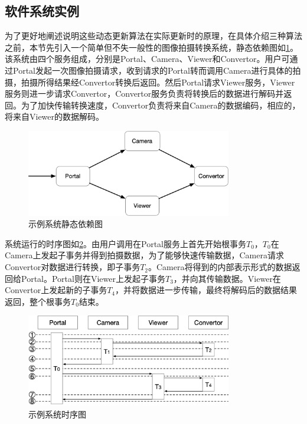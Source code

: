 \documentclass[macfonts,master]{njuthesis}
\begin{document}
\subsection{软件系统实例}\label{sec:example}
为了更好地阐述说明这些动态更新算法在实际更新时的原理，在具体介绍三种算法之前，本节先引入一个简单但不失一般性的图像拍摄转换系统，静态依赖图如\ref{fig:example}。该系统由四个服务组成，分别是Portal、Camera、Viewer和Convertor。用户可通过Portal发起一次图像拍摄请求，收到请求的Portal转而调用Camera进行具体的拍摄，拍摄所得结果经Convertor转换后返回。然后Portal请求Viewer服务，Viewer服务则进一步请求Convertor，Convertor服务负责将转换后的数据进行解码并返回。为了加快传输转换速度，Convertor负责将来自Camera的数据编码，相应的，将来自Viewer的数据解码。

\begin{figure}[!htbp]
  \centering
  \includegraphics[width= 0.8\textwidth]{image/example.png}
  \caption{示例系统静态依赖图}
  \label{fig:example}
\end{figure}

系统运行的时序图如\ref{fig:timing}。由用户调用在Portal服务上首先开始根事务$T_0$，$T_0$在Camera上发起子事务并得到拍摄数据，为了能够快速传输数据，Camera请求Convertor对数据进行转换，即子事务$T_2$。Camera将得到的内部表示形式的数据返回给Portal。Portal则在Viewer上发起子事务$T_3$，并向其传输数据。Viewer在Convertor上发起新的子事务$T_4$，并将数据进一步传输，最终将解码后的数据结果返回，整个根事务$T_0$结束。

\begin{figure}[!htbp]
  \centering
  \includegraphics[width= 0.8\textwidth]{image/timing.png}
  \caption{示例系统时序图}
  \label{fig:timing}
\end{figure}
\end{document}

